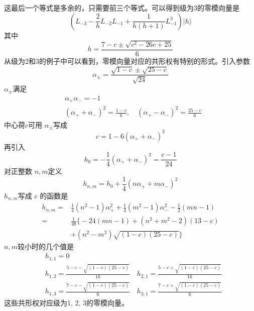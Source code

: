 这最后一个等式是多余的，只需要前三个等式。可以得到级为3的零模向量是
\begin{equation}
\left(L_{-3}-\frac{2}{h} L_{-2} L_{-1}+\frac{1}{h( h+1)} L_{-1}^{3}\right)|h\rangle
\end{equation}
其中
\begin{equation}
	h=\frac{7-c \pm \sqrt{c^{2}-26 c+25}}{6}
\end{equation}
从级为2和3的例子中可以看到，零模向量对应的共形权有特别的形式。引入参数
\begin{equation}
\alpha_{\pm}=\frac{\sqrt{1-c} \pm \sqrt{25-c}}{\sqrt{24}}
\end{equation}
$\alpha_{\pm} $满足
\begin{align} &\alpha_{+} \alpha_{-}=-1 \\ &\left(\alpha_{+}+\alpha_{-}\right)^{2}=\frac{1-c}{6}, \quad\left(\alpha_{+}-\alpha_{-}\right)^{2}=\frac{25-c}{6}  \end{align}
中心荷$ c $可用 $\alpha_{\pm} $写成
\begin{equation}
	c=1-6\left(\alpha_{+}+\alpha_{-}\right)^{2}
\end{equation}
再引入
\begin{equation}
	h_{0}=-\frac{1}{4}\left(\alpha_{+}+\alpha_{-}\right)^{2}=\frac{c-1}{24}
\end{equation}
对正整数 $n,m $定义
\begin{equation}
	h_{n, m}=h_{0}+\frac{1}{4}\left(n \alpha_{+}+m \alpha_{-}\right)^{2}
\end{equation}
$h_{n,m} $写成 $c$ 的函数是
\begin{equation}
	\begin{aligned} h_{n, m}=&\frac{1}{4}\left(n^{2}-1\right) \alpha_{+}^{2}+\frac{1}{4}\left(m^{2}-1\right) \alpha_{-}^{2}-\frac{1}{2}(m n-1) \\ =& \frac{1}{48}\Big\{-24(m n-1)+\left(n^{2}+m^{2}-2\right)(13-c)\\&+\left(n^{2}-m^{2}\right) \sqrt{(1-c)(25-c)}\Big\} \end{aligned}
\end{equation}
$n,m $较小时的几个值是
\begin{equation*}
	\begin{aligned} &h_{1,1}=0 \\& h_{1,2}=\frac{5-c-\sqrt{(1-c)(25-c)}}{16} \quad h_{2,1}=\frac{5-c+\sqrt{(1-c)(25-c)}}{16} \\& h_{1,3}=\frac{7-c-\sqrt{(1-c)(25-c)}}{6} \quad h_{3,1}=\frac{7-c+\sqrt{(1-c)(25-c)}}{6} \end{aligned}
\end{equation*}
这些共形权对应级为1, 2, 3的零模向量。

